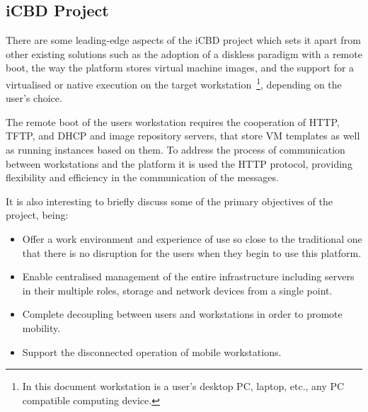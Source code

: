 


\subsection{iCBD Project} %
\label{sub:icbd_project}

There are some leading-edge aspects of the \acrfull{iCBD} project which sets it apart from other existing solutions such as the adoption of a diskless paradigm with a remote boot, the way the platform stores virtual machine images, and the support for a virtualised or native execution on the target workstation~\footnote{In this document workstation is a user's desktop PC, laptop, etc., any PC compatible computing device.}, depending on the user's choice.~\cite{P2020}

The remote boot of the users workstation requires the cooperation of \acrshort{HTTP}, \acrshort{TFTP}, and \acrshort{DHCP} and image repository servers, that store VM templates as well as running instances based on them.
To address the process of communication between workstations and the platform it is used the HTTP protocol, providing flexibility and efficiency in the communication of the messages.~\cite{P2020,Nuno2016,Eduardo2016}



It is also interesting to briefly discuss some of the primary objectives of the project, being:
\begin{itemize}
    \item Offer a work environment and experience of use so close to the traditional one that there is no disruption for the users when they begin to use this platform.
    \item Enable centralised management of the entire infrastructure including servers in their multiple roles, storage and network devices from a single point.
    \item Complete decoupling between users and workstations in order to promote mobility.
    \item Support the disconnected operation of mobile workstations.
\end{itemize}

